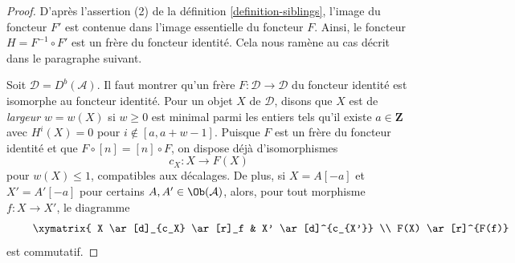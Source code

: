 \begin{proof}
D'après l'assertion (2) de la définition \ref{definition-siblings}, l'image du foncteur
$F'$ est contenue dans l'image essentielle du foncteur $F$. Ainsi,
le foncteur $H = F^{-1} \circ F'$ est un frère du foncteur identité.
Cela nous ramène au cas décrit dans le paragraphe suivant.

\medskip\noindent
Soit $\mathcal{D} = D^b(\mathcal{A})$. Il faut montrer qu'un frère
$F : \mathcal{D} \to \mathcal{D}$ du foncteur identité est
isomorphe au foncteur identité. Pour un objet $X$ de $\mathcal{D}$,
disons que $X$ est de {\it largeur} $w = w(X)$ si $w \geq 0$ est minimal
parmi les entiers tels qu'il existe $a \in \mathbf{Z}$ avec $H^i(X) = 0$
pour $i \not \in [a, a + w - 1]$. Puisque $F$ est un frère du foncteur identité
et que $F \circ [n] = [n] \circ F$, on dispose déjà d'isomorphismes
$$
c_X : X \to F(X)
$$
pour $w(X) \leq 1$, compatibles aux décalages. De plus, si $X = A[-a]$ et
$X' = A'[-a]$ pour certains $A, A' \in \Ob(\mathcal{A})$, alors, pour tout morphisme
$f : X \to X'$, le diagramme
\begin{equation}
\label{equation-to-show}
\vcenter{
\xymatrix{
X \ar[d]_{c_X} \ar[r]_f &
X' \ar[d]^{c_{X'}} \\
F(X) \ar[r]^{F(f)} &
F(X')
}
}
\end{equation}
est commutatif.


\end{proof}
